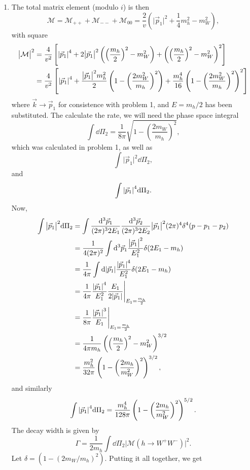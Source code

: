 \documentclass[12pt]{article}
\newcommand{\magsq}[1]{\big|#1\big|^2}
\begin{document}
\begin{enumerate}[label=(\alph*)]
    \item The total matrix element (modulo $i$) is then
    \[ \mathcal{M} = \mathcal{M}_{++} + \mathcal{M}_{--} + \mathcal{M}_{00} = \frac{2}{v}\left(\magsq{\vec{p}_1} + \frac{1}{4}m_h^2 - m_W^2\right), \]
    with square
    \begin{align*}
        \magsq{\mathcal{M}} &= \frac{4}{v^2}\left[\abs{\vec{p}_1}^4 + 2\magsq{\vec{p}_1}\left(\left(\frac{m_h}{2}\right)^2 - m_W^2\right) + \left(\left(\frac{m_h}{2}\right)^2 - m_W^2\right)^2\right] \\
        &= \frac{4}{v^2}\left[\abs{\vec{p}_1}^4 + \frac{\magsq{\vec{p}_1}m_h^2}{2}\left(1-\left(\frac{2m_W^2}{m_h}\right)^2\right) + \frac{m_h^4}{16}\left(1-\left(\frac{2m_W^2}{m_h}\right)^2\right)^2 \right]
    \end{align*}
    where $\vec{k} \to \vec{p}_1$ for consistence with problem 1, and $E=m_h/2$ has been substituted. The calculate the rate, we will need the phase space integral
    \[ \int\dd\Pi_2 =  \frac{1}{8\pi}\sqrt{1 - \left(\frac{2m_W}{m_h}\right)^2}, \]
    which was calculated in problem 1, as well as
    \[ \int\magsq{\vec{p}_1}\dd\Pi_2, \]
    and 
    \[ \int\abs{\vec{p}_1}^4\dd\Pi_2. \]
    Now,
    \begin{align*}
        \int\magsq{\vec{p}_1}\dd\Pi_2 &= \int \frac{\dd^3\vec{p}_1}{(2\pi)^32E_1}\frac{\dd^3\vec{p}_2}{(2\pi)^32E_2}\magsq{\vec{p}_1}(2\pi)^4\delta^4(p - p_1 - p_2) \\
        &= \frac{1}{4(2\pi)^2}\int\dd^3\vec{p}_1\frac{\magsq{\vec{p}_1}}{E_1^2}\delta(2E_1-m_h) \\
        &= \frac{1}{4\pi}\int\dd\abs{\vec{p}_1}\frac{\abs{\vec{p}_1}^4}{E_1^2}\delta(2E_1-m_h) \\
        &= \frac{1}{4\pi}\frac{\abs{\vec{p}_1}^4}{E_1^2}\frac{E_1}{2\abs{\vec{p}_1}}\Biggr\rvert_{E_1=\frac{m_h}{2}} \\
        &= \frac{1}{8\pi}\frac{\abs{\vec{p}_1}^3}{E_1}\Biggr\rvert_{E_1=\frac{m_h}{2}} \\
        &= \frac{1}{4\pi m_h}\left(\left(\frac{m_h}{2}\right)^2 - m_W^2\right)^{3/2} \\
        &= \frac{m_h^2}{32\pi}\left(1 - \left(\frac{2m_h}{m_W^2}\right)^2\right)^{3/2},
    \end{align*}
    and similarly
    \[ \int\abs{\vec{p}_1}^4\dd\Pi_2 = \frac{m_h^4}{128\pi}\left(1 - \left(\frac{2m_h}{m_W^2}\right)^2\right)^{5/2}. \]
    The decay width is given by
    \[ \Gamma = \frac{1}{2m_h}\int\dd\Pi_2\magsq{\mathcal{M}(h\to W^+W^-)}. \]
    Let $\delta = (1 - (2m_W/m_h)^2)$. Putting it all together, we get

\end{enumerate}
\end{document}
